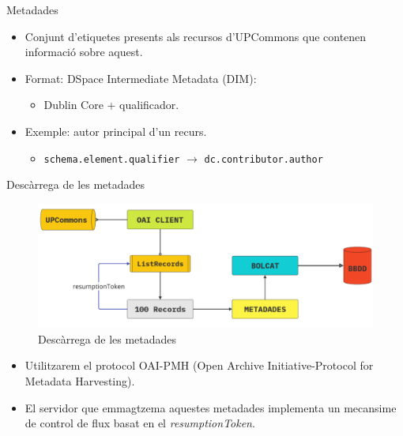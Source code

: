 \begin{frame}{Metadades}
    \begin{itemize}%
        \item Conjunt d’etiquetes presents als recursos d’UPCommons que contenen informació sobre aquest.
        \item Format: DSpace Intermediate Metadata (DIM):
        \begin{itemize}%
            \item Dublin Core + qualificador.
        \end{itemize}
        \item Exemple: autor principal d'un recurs.
        \begin{itemize}%
            \item \texttt{schema.element.qualifier} \(\rightarrow\) \texttt{dc.contributor.author}
        \end{itemize}
    \end{itemize}
\end{frame}


\begin{frame}{Descàrrega de les metadades}

    \begin{figure}
        \includegraphics[width=\textwidth]{figures/metadata-processing}
        \caption{Descàrrega de les metadades}\label{fig:metadata-processing}
    \end{figure}

    \begin{itemize}%
        \item Utilitzarem el protocol OAI-PMH (Open Archive Initiative-Protocol for Metadata Harvesting).
        \item El servidor que emmagtzema aquestes metadades implementa un mecansime de control de flux basat en el \textit{resumptionToken}.
    \end{itemize}

\end{frame}